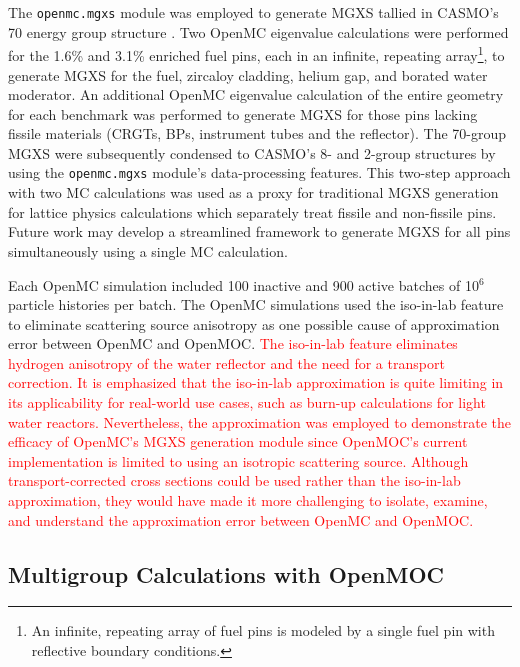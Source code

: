 The \texttt{openmc.mgxs} module was employed to generate MGXS tallied in CASMO's 70 energy group structure \cite{rhodes2006casmo}. Two OpenMC eigenvalue calculations were performed for the 1.6\% and 3.1\% enriched fuel pins, each in an infinite, repeating array\footnote{An infinite, repeating array of fuel pins is modeled by a single fuel pin with reflective boundary conditions.}, to generate MGXS for the fuel, zircaloy cladding, helium gap, and borated water moderator. An additional OpenMC eigenvalue calculation of the entire geometry for each benchmark was performed to generate MGXS for those pins lacking fissile materials (CRGTs, BPs, instrument tubes and the reflector). The 70-group MGXS were subsequently condensed to CASMO's 8- and 2-group structures by using the \texttt{openmc.mgxs} module's data-processing features. This two-step approach with two MC calculations was used as a proxy for traditional MGXS generation for lattice physics calculations which separately treat fissile and non-fissile pins. Future work may develop a streamlined framework to generate MGXS for all pins simultaneously using a single MC calculation.

Each OpenMC simulation included 100 inactive and 900 active batches of 10$^{6}$ particle histories per batch. The OpenMC simulations used the iso-in-lab feature to eliminate scattering source anisotropy as one possible cause of approximation error between OpenMC and OpenMOC. \textcolor{red}{The iso-in-lab feature eliminates hydrogen anisotropy of the water reflector and the need for a transport correction. It is emphasized that the iso-in-lab approximation is quite limiting in its applicability for real-world use cases, such as burn-up calculations for light water reactors. Nevertheless, the approximation was employed to demonstrate the efficacy of OpenMC's MGXS generation module since OpenMOC's current implementation is limited to using an isotropic scattering source. Although transport-corrected cross sections could be used rather than the iso-in-lab approximation, they would have made it more challenging to isolate, examine, and understand the approximation error between OpenMC and OpenMOC.}

\subsection{Multigroup Calculations with OpenMOC}
\label{subsec:openmoc}


